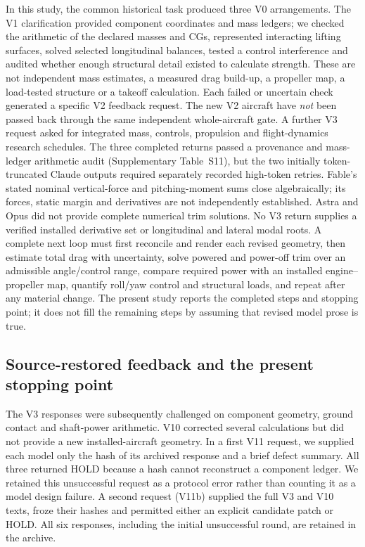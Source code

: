 \documentclass[11pt,a4paper]{article}
\begin{document}
In this study, the common historical task produced three V0 arrangements. The V1 clarification provided component coordinates and mass ledgers; we checked the arithmetic of the declared masses and CGs, represented interacting lifting surfaces, solved selected longitudinal balances, tested a control interference and audited whether enough structural detail existed to calculate strength. These are not independent mass estimates, a measured drag build-up, a propeller map, a load-tested structure or a takeoff calculation. Each failed or uncertain check generated a specific V2 feedback request. The new V2 aircraft have \emph{not} been passed back through the same independent whole-aircraft gate. A further V3 request asked for integrated mass, controls, propulsion and flight-dynamics research schedules. The three completed returns passed a provenance and mass-ledger arithmetic audit (Supplementary Table~S11), but the two initially token-truncated Claude outputs required separately recorded high-token retries. Fable's stated nominal vertical-force and pitching-moment sums close algebraically; its forces, static margin and derivatives are not independently established. Astra and Opus did not provide complete numerical trim solutions. No V3 return supplies a verified installed derivative set or longitudinal and lateral modal roots. A complete next loop must first reconcile and render each revised geometry, then estimate total drag with uncertainty, solve powered and power-off trim over an admissible angle/control range, compare required power with an installed engine--propeller map, quantify roll/yaw control and structural loads, and repeat after any material change. The present study reports the completed steps and stopping point; it does not fill the remaining steps by assuming that revised model prose is true.

\subsection{Source-restored feedback and the present stopping point}
The V3 responses were subsequently challenged on component geometry, ground contact and shaft-power arithmetic. V10 corrected several calculations but did not provide a new installed-aircraft geometry. In a first V11 request, we supplied each model only the hash of its archived response and a brief defect summary. All three returned HOLD because a hash cannot reconstruct a component ledger. We retained this unsuccessful request as a protocol error rather than counting it as a model design failure. A second request (V11b) supplied the full V3 and V10 texts, froze their hashes and permitted either an explicit candidate patch or HOLD. All six responses, including the initial unsuccessful round, are retained in the archive.
\end{document}
